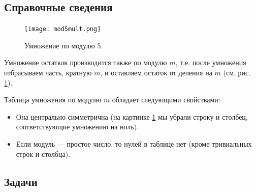 
\subsection*{Справочные сведения}

\begin{figure}
\texttt{[image: mod5mult.png]}
\caption{Умножение по модулю 5.}\label{mod5mult}
\end{figure}
Умножение остатков производится также по модулю $m$, т.е. после умножения отбрасываем часть, кратную $m$, и оставляем остаток от деления на $m$ (см. рис. \ref{mod5mult}).

Таблица умножения по модулю $m$ обладает следующими свойствами:
\begin{itemize}
\item Она центрально симметрична (на картинке \ref{mod5mult} мы убрали строку и столбец, соответствующие умножению на ноль).
\item Если модуль --- простое число, то нулей в таблице нет (кроме тривиальных строк и столбца).
\end{itemize}


\subsection*{Задачи}

